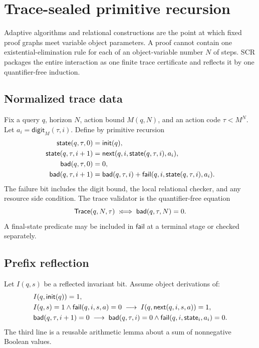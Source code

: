 \section{Trace-sealed primitive recursion}
\label{sec:trace}

Adaptive algorithms and relational constructions are the point at which fixed
proof graphs meet variable object parameters.  A proof cannot contain one
existential-elimination rule for each of an object-variable number \(N\) of
steps.  SCR packages the entire interaction as one finite trace certificate
and reflects it by one quantifier-free induction.

\subsection{Normalized trace data}

Fix a query \(q\), horizon \(N\), action bound \(M(q,N)\), and an action code
\(\tau<M^N\).  Let \(a_i=\mathsf{digit}_M(\tau,i)\).  Define by primitive
recursion
\[
\begin{aligned}
  \mathsf{state}(q,\tau,0)&=\mathsf{init}(q),\\
  \mathsf{state}(q,\tau,i+1)&=\mathsf{next}(q,i,\mathsf{state}(q,\tau,i),a_i),\\
  \mathsf{bad}(q,\tau,0)&=0,\\
  \mathsf{bad}(q,\tau,i+1)&=\mathsf{bad}(q,\tau,i)+
     \mathsf{fail}(q,i,\mathsf{state}(q,\tau,i),a_i).
\end{aligned}
\]
The failure bit includes the digit bound, the local relational checker, and
any resource side condition.  The trace validator is the quantifier-free
equation
\[
       \mathsf{Trace}(q,N,\tau)\;:\!\Longleftrightarrow\;
       \mathsf{bad}(q,\tau,N)=0.
\]
A final-state predicate may be included in \(\mathsf{fail}\) at a terminal
stage or checked separately.

\subsection{Prefix reflection}

Let \(I(q,s)\) be a reflected invariant bit.  Assume object derivations of:
\[
\begin{aligned}
  &I(q,\mathsf{init}(q))=1,\\
  &I(q,s)=1\wedge\mathsf{fail}(q,i,s,a)=0
      \;\longrightarrow\;
    I(q,\mathsf{next}(q,i,s,a))=1,\\
  &\mathsf{bad}(q,\tau,i+1)=0
      \;\longrightarrow\;
    \mathsf{bad}(q,\tau,i)=0\wedge\mathsf{fail}(q,i,\mathsf{state}_i,a_i)=0.
\end{aligned}
\]
The third line is a reusable arithmetic lemma about a sum of nonnegative
Boolean values.

